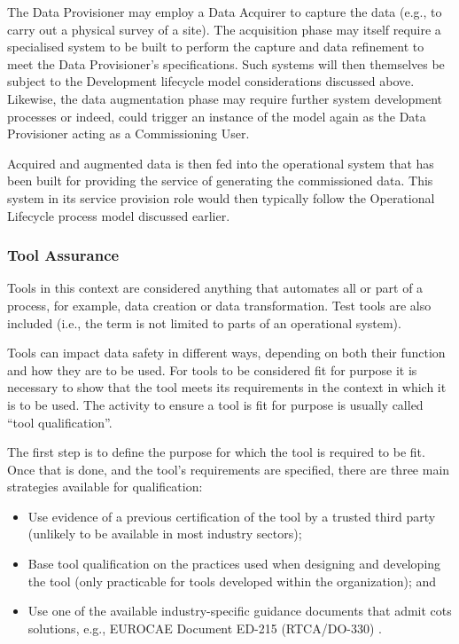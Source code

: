 The Data Provisioner may employ a Data Acquirer to capture the data (e.g., to carry out a physical survey of a site). The acquisition phase may itself require a specialised system to be built to perform the capture and data refinement to meet the Data Provisioner's specifications. Such systems will then themselves be subject to the Development lifecycle model considerations discussed above. Likewise, the data augmentation phase may require further system development processes or indeed, could trigger an instance of the model again as the Data Provisioner acting as a Commissioning User.

Acquired and augmented data is then fed into the operational system that has been built for providing the service of generating the commissioned data. This system in its service provision role would then typically follow the Operational Lifecycle process model discussed earlier.

\subsubsection{Tool Assurance}
Tools in this context are considered anything that automates all or part of a process, for example, data creation or data transformation. Test tools are also included (i.e., the term is not limited to parts of an operational system).

Tools can impact data safety in different ways, depending on both their function and how they are to be used. For tools to be considered fit for purpose it is necessary to show that the tool meets its requirements in the context in which it is to be used. The activity to ensure a tool is fit for purpose is usually called ``tool qualification''.

The first step is to define the purpose for which the tool is required to be fit. Once that is done, and the tool's requirements are specified, there are three main strategies available for qualification:
\begin{itemize}
  \item Use evidence of a previous certification of the tool by a trusted third party (unlikely to be available in most industry sectors);
  \item Base tool qualification on the practices used when designing and developing the tool (only practicable for tools developed within the organization); and
  \item Use one of the available industry-specific guidance documents that admit \gls{cots} solutions, e.g., EUROCAE Document ED-215 (RTCA/DO-330) \cite{citation:ED215}.
\end{itemize}

